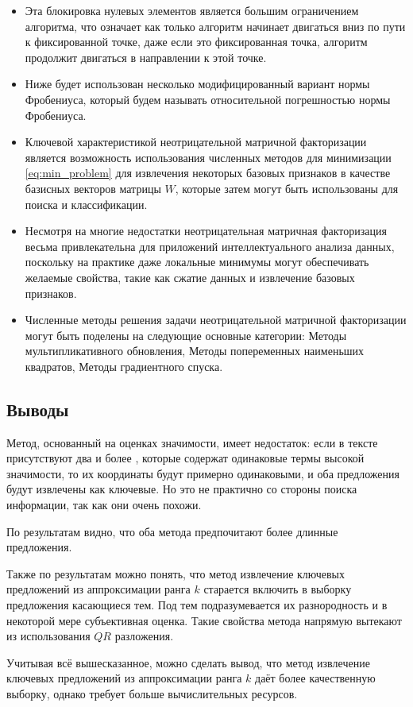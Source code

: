\begin{itemize}
  \item Эта блокировка нулевых элементов является большим ограничением алгоритма,
  что означает как только алгоритм начинает двигаться вниз по пути к фиксированной точке,
  даже если это  фиксированная точка, алгоритм продолжит двигаться в направлении к этой точке.
  \item Ниже будет использован несколько модифицированный вариант нормы Фробениуса, который будем называть относительной погрешностью нормы Фробениуса.
  \item  Ключевой характеристикой неотрицательной матричной факторизации является возможность
  использования численных методов для минимизации \eqref{eq:min_problem}
  для извлечения некоторых базовых признаков в качестве базисных векторов матрицы $W​$,
  которые затем могут быть использованы для поиска и классификации.
  \item Несмотря на многие недостатки неотрицательная матричная факторизация весьма привлекательна для приложений интеллектуального анализа данных,
  поскольку на практике даже локальные минимумы могут обеспечивать желаемые свойства, такие как сжатие данных и извлечение базовых признаков.
  \item Численные методы решения задачи неотрицательной матричной факторизации могут быть поделены на следующие основные категории: 	Методы мультипликативного обновления, 	Методы попеременных наименьших квадратов, 	Методы градиентного спуска.

\end{itemize}

\newpage

\subsection{Выводы}

Метод, основанный на оценках значимости, имеет недостаток:
если в тексте присутствуют два и более , которые содержат одинаковые термы высокой значимости,
то их координаты будут примерно одинаковыми, и оба предложения будут извлечены как ключевые.
Но это не практично со стороны поиска информации, так как они очень похожи.

По результатам видно, что оба метода предпочитают более длинные предложения.

Также по результатам можно понять, что метод извлечение ключевых предложений из
аппроксимации ранга $k$ старается включить в выборку предложения касающиеся  тем.
Под  тем подразумевается их разнородность и в некоторой мере субъективная оценка.
Такие свойства метода напрямую вытекают из использования $QR$ разложения.

Учитывая всё вышесказанное, можно сделать вывод, что метод извлечение ключевых предложений из
аппроксимации ранга $k$ даёт более качественную выборку, однако требует больше вычислительных ресурсов.
